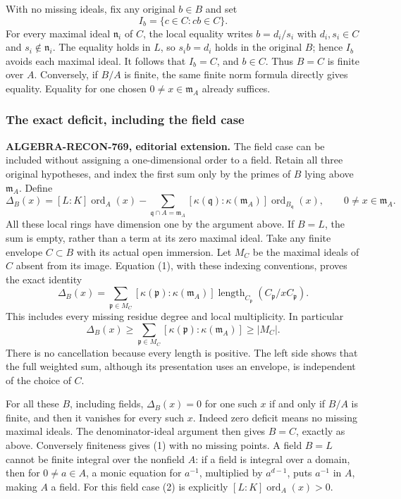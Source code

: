 With no missing ideals, fix any original \(b\in B\) and set \[
 I_b=\{c\in C:cb\in C\}.
\] For every maximal ideal \(\mathfrak n_i\) of \(C\), the local equality writes \(b=d_i/s_i\) with \(d_i,s_i\in C\) and \(s_i\notin\mathfrak n_i\). The equality holds in \(L\), so \(s_i b=d_i\) holds in the original \(B\); hence \(I_b\) avoids each maximal ideal. It follows that \(I_b=C\), and \(b\in C\). Thus \(B=C\) is finite over \(A\). Conversely, if \(B/A\) is finite, the same finite norm formula directly gives equality. Equality for one chosen \(0\ne x\in\mathfrak m_A\) already suffices.

\subsubsection{The exact deficit, including the field case}\label{algebra-proof-033-the-exact-deficit-including-the-field-case}

\textbf{ALGEBRA-RECON-769, editorial extension.} The field case can be included without assigning a one-dimensional order to a field. Retain all three original hypotheses, and index the first sum only by the primes of \(B\) lying above \(\mathfrak m_A\). Define \[
 \Delta_B(x)
 =
 [L:K]\operatorname{ord}_A(x)
 -
 \sum_{\mathfrak q\cap A=\mathfrak m_A}
       [\kappa(\mathfrak q):\kappa(\mathfrak m_A)]
       \operatorname{ord}_{B_{\mathfrak q}}(x),
 \qquad 0\ne x\in\mathfrak m_A.
 \tag{2}
\] All these local rings have dimension one by the argument above. If \(B=L\), the sum is empty, rather than a term at its zero maximal ideal. Take any finite envelope \(C\subset B\) with its actual open immersion. Let \(M_C\) be the maximal ideals of \(C\) absent from its image. Equation (1), with these indexing conventions, proves the exact identity \[
 \Delta_B(x)=
 \sum_{\mathfrak p\in M_C}
     [\kappa(\mathfrak p):\kappa(\mathfrak m_A)]
     \operatorname{length}_{C_{\mathfrak p}}
                          (C_{\mathfrak p}/xC_{\mathfrak p}).
 \tag{3}
\] This includes every missing residue degree and local multiplicity. In particular \[
 \Delta_B(x)\geq
 \sum_{\mathfrak p\in M_C}
       [\kappa(\mathfrak p):\kappa(\mathfrak m_A)]
 \geq |M_C|.
\] There is no cancellation because every length is positive. The left side shows that the full weighted sum, although its presentation uses an envelope, is independent of the choice of \(C\).

For all these \(B\), including fields, \(\Delta_B(x)=0\) for one such \(x\) if and only if \(B/A\) is finite, and then it vanishes for every such \(x\). Indeed zero deficit means no missing maximal ideals. The denominator-ideal argument then gives \(B=C\), exactly as above. Conversely finiteness gives (1) with no missing points. A field \(B=L\) cannot be finite integral over the nonfield \(A\): if a field is integral over a domain, then for \(0\ne a\in A\), a monic equation for \(a^{-1}\), multiplied by \(a^{d-1}\), puts \(a^{-1}\) in \(A\), making \(A\) a field. For this field case (2) is explicitly \([L:K]\operatorname{ord}_A(x)>0\).

